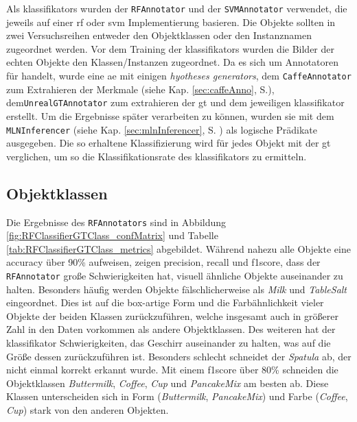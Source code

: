 Als \glspl{klassifikator} wurden der \texttt{RFAnnotator} und der \texttt{SVMAnnotator} verwendet, die jeweils auf einer \gls{rf} oder \gls{svm} Implementierung basieren. Die Objekte sollten in zwei Versuchsreihen entweder den Objektklassen oder den Instanznamen zugeordnet werden. Vor dem Training der \glspl{klassifikator} wurden die Bilder der echten Objekte den Klassen/Instanzen zugeordnet. Da es sich um Annotatoren für \robosherlock handelt, wurde eine \gls{ae} mit einigen \textit{hyotheses generators}, dem \texttt{CaffeAnnotator} zum Extrahieren der Merkmale (siehe Kap. \ref{sec:caffeAnno}, S.\pageref{sec:caffeAnno}), dem\linebreak \texttt{UnrealGTAnnotator} zum extrahieren der \gls{gt} und dem jeweiligen \gls{klassifikator} erstellt. Um die Ergebnisse später verarbeiten zu können, wurden sie mit dem \texttt{MLNInferencer} (siehe Kap. \ref{sec:mlnInferencer}, S. \pageref{sec:mlnInferencer}) als logische Prädikate ausgegeben. Die so erhaltene Klassifizierung wird für jedes Objekt mit der \gls{gt} verglichen, um so die Klassifikationsrate des \gls{klassifikator}s zu ermitteln.

\subsection{Objektklassen}
Die Ergebnisse des \texttt{RFAnnotators} sind in Abbildung \ref{fig:RFClassifierGTClass_confMatrix} und Tabelle \ref{tab:RFClassifierGTClass_metrics} abgebildet. Während nahezu alle Objekte eine \gls{accuracy} über 90\% aufweisen, zeigen \gls{precision}, \gls{recall} und \gls{f1score}, dass der \texttt{RFAnnotator} große Schwierigkeiten hat, visuell ähnliche Objekte auseinander zu halten. Besonders häufig werden Objekte fälschlicherweise als \textit{Milk} und \textit{TableSalt} eingeordnet. Dies ist auf die box-artige Form und die Farbähnlichkeit vieler Objekte der beiden Klassen zurückzuführen, welche insgesamt auch in größerer Zahl in den Daten vorkommen als andere Objektklassen. Des weiteren hat der \gls{klassifikator} Schwierigkeiten, das Geschirr auseinander zu halten, was auf die Größe dessen zurückzuführen ist. Besonders schlecht schneidet der \textit{Spatula} ab, der nicht einmal korrekt erkannt wurde. Mit einem \gls{f1score} über 80\% schneiden die Objektklassen \textit{Buttermilk}, \textit{Coffee}, \textit{Cup} und \textit{PancakeMix} am besten ab. Diese Klassen unterscheiden sich in Form (\textit{Buttermilk}, \textit{PancakeMix}) und Farbe (\textit{Coffee}, \textit{Cup}) stark von den anderen Objekten.  \par

